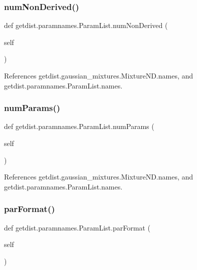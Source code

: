 \subsubsection{\texorpdfstring{num\+Non\+Derived()}{numNonDerived()}}
{\footnotesize\ttfamily def getdist.\+paramnames.\+Param\+List.\+num\+Non\+Derived (\begin{DoxyParamCaption}\item[{}]{self }\end{DoxyParamCaption})}



References getdist.\+gaussian\+\_\+mixtures.\+Mixture\+N\+D.\+names, and getdist.\+paramnames.\+Param\+List.\+names.

\mbox{\label{classgetdist_1_1paramnames_1_1ParamList_a03103e421f137da28ca687ee41e8adb9}} 
\subsubsection{\texorpdfstring{num\+Params()}{numParams()}}
{\footnotesize\ttfamily def getdist.\+paramnames.\+Param\+List.\+num\+Params (\begin{DoxyParamCaption}\item[{}]{self }\end{DoxyParamCaption})}



References getdist.\+gaussian\+\_\+mixtures.\+Mixture\+N\+D.\+names, and getdist.\+paramnames.\+Param\+List.\+names.

\mbox{\label{classgetdist_1_1paramnames_1_1ParamList_a99b5b8568cc722be33974838ee0aefc5}} 
\subsubsection{\texorpdfstring{par\+Format()}{parFormat()}}
{\footnotesize\ttfamily def getdist.\+paramnames.\+Param\+List.\+par\+Format (\begin{DoxyParamCaption}\item[{}]{self }\end{DoxyParamCaption})}



